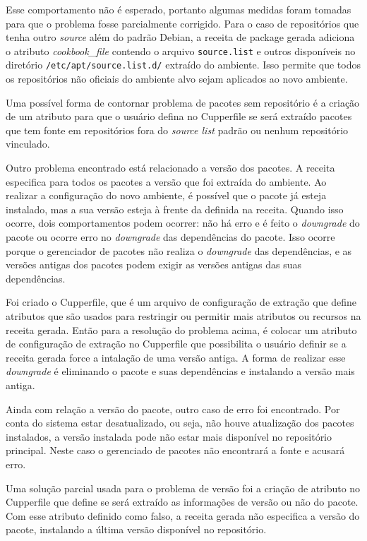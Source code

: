 Esse comportamento não é esperado, portanto algumas medidas foram tomadas para
que o problema fosse parcialmente corrigido. Para o caso de repositórios que
tenha outro \textit{source} além do padrão Debian, a receita de package gerada adiciona
o atributo \textit{cookbook\_file} contendo o arquivo \texttt{source.list} e outros disponíveis
no diretório \texttt{/etc/apt/source.list.d/} extraído do ambiente. Isso permite
que todos os repositórios não oficiais do ambiente alvo sejam aplicados ao novo ambiente.

Uma possível forma de contornar problema de pacotes sem repositório é
a criação de um atributo para que o usuário defina no Cupperfile se
será extraído pacotes que tem fonte em repositórios fora do \textit{source list} padrão ou
nenhum repositório vinculado.

Outro problema encontrado está relacionado a versão dos pacotes.
A receita especifica para todos os pacotes a versão que foi extraída do ambiente.
Ao realizar a configuração do novo ambiente, é possível que o pacote já esteja instalado,
mas a sua versão esteja à frente da definida na receita. Quando isso ocorre, dois comportamentos
podem ocorrer: não há erro e é feito o \textit{downgrade} do pacote ou ocorre erro no \textit{downgrade} das
dependências do pacote. Isso ocorre porque o gerenciador de pacotes não realiza o \textit{downgrade}
das dependências, e as versões antigas dos pacotes podem exigir as versões antigas das suas
dependências.

Foi criado o Cupperfile, que é um arquivo de configuração de extração que define atributos
que são usados para restringir ou permitir mais atributos ou recursos na receita gerada.
Então para a resolução do problema acima, é colocar um atributo de configuração de extração no
Cupperfile que possibilita o usuário definir se a receita gerada force a intalação de uma
versão antiga. A forma de realizar esse \textit{downgrade} é eliminando o pacote e suas dependências
e instalando a versão mais antiga.

Ainda com relação a versão do pacote, outro caso de erro foi encontrado.
Por conta do sistema estar desatualizado, ou seja, não houve atualização dos pacotes
instalados, a versão instalada pode não estar mais disponível no repositório principal.
Neste caso o gerenciado de pacotes não encontrará a fonte e acusará erro.

Uma solução parcial usada para o problema de versão foi a criação de atributo no
Cupperfile que define se será extraído as informações de versão ou não do pacote.
Com esse atributo definido como falso, a receita gerada não especifica a versão
do pacote, instalando a última versão disponível no repositório.
